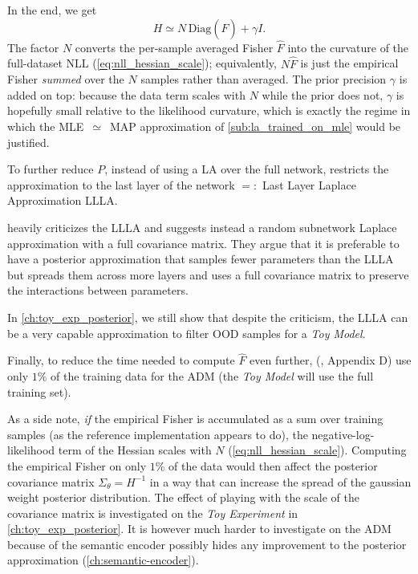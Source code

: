 In the end, we get
\begin{equation}
H \simeq N\,\mathrm{Diag}(\hat{F}) + \gamma I.
\end{equation}
The factor $N$ converts the per-sample averaged Fisher $\hat F$ into the curvature of the full-dataset \acs{NLL} (\autoref{eq:nll_hessian_scale}); equivalently, $N\hat F$ is just the empirical Fisher \emph{summed} over the $N$ samples rather than averaged. The prior precision $\gamma$ is added on top: because the data term scales with $N$ while the prior does not, $\gamma$ is hopefully small relative to the likelihood curvature, which is exactly the regime in which the \acs{MLE}~$\simeq$~\acs{MAP} approximation of \autoref{sub:la_trained_on_mle} would be justified.

To further reduce $P$, instead of using a \acs{LA} over the full network, \cite{jazbec_generative_2025} restricts the approximation to the last layer of the network $=:$ Last Layer Laplace Approximation \acs{LLLA}.

\begin{tcolorbox}[colback=orange!10!white,colframe=orange!50!black,sharp corners]
\cite{gupta_quantifying_2026} heavily criticizes the \acs{LLLA} and suggests instead a random subnetwork Laplace approximation with a full covariance matrix. They argue that it is preferable to have a posterior approximation that samples fewer parameters than the \acs{LLLA} but spreads them across more layers and uses a full covariance matrix to preserve the interactions between parameters.

In \autoref{ch:toy_exp_posterior}, we still show that despite the criticism, the \acs{LLLA} can be a very capable approximation to filter \acs{OOD} samples for a \textit{Toy Model}.
\end{tcolorbox}

Finally, to reduce the time needed to compute $\hat{F}$ even further, (\cite{jazbec_generative_2025}, Appendix D) use only $1\%$ of the training data for the \acs{ADM} (the \textit{Toy Model} will use the full training set).

\begin{tcolorbox}[colback=orange!10!white,colframe=orange!50!black,sharp corners]
As a side note, \emph{if} the empirical Fisher is accumulated as a sum over training samples (as the reference implementation \parencite{jazbec_generative_2025} appears to do), the negative-log-likelihood term of the Hessian scales with $N$ (\autoref{eq:nll_hessian_scale}). Computing the empirical Fisher on only $1\%$ of the data would then affect the posterior covariance matrix $\Sigma_\theta = H^{-1}$ in a way that can increase the spread of the gaussian weight posterior distribution. The effect of playing with the scale of the covariance matrix is investigated on the \textit{Toy Experiment} in \autoref{ch:toy_exp_posterior}. It is however much harder to investigate on the \acs{ADM} because of the semantic encoder possibly hides any improvement to the posterior approximation (\autoref{ch:semantic-encoder}).
\end{tcolorbox}

